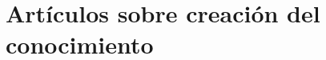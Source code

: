 \documentclass[12pt,letterpaper]{book}
\begin{document}
\hojaportada
\hojalicencia
\tablacontenido
\frontmatter
\hojapresentacion
\hojaeditorial
\mainmatter
\fancychapterstyle
{}

\chapter{Artículos sobre creación del conocimiento}\BgThispage


%

%

%

\hojacontraportada
\end{document}
